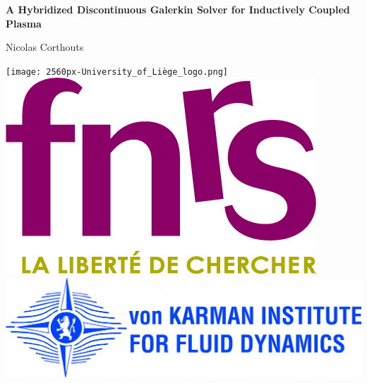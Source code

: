 \documentclass[24pt,t,table, aspectratio=169]{beamer}
\begin{document}
\begin{frame}
  
  \large
  \begin{center}
  \begin{mdframed}[linecolor=orange, backgroundcolor=orange!20]
  \Large
  \centering
  \textbf{A Hybridized Discontinuous Galerkin Solver for Inductively Coupled Plasma}
  
  \small
  
  Nicolas Corthouts
  \end{mdframed}
  \end{center}
  \begin{center}
  \end{center}
  
%
  \texttt{[image: 2560px-University\_of\_Liège\_logo.png]}\hfill\includegraphics[height=1 cm]{FRS-FNRS_ros_vert_transp.png}\hfill\includegraphics[height =1 cm]{vki_logo_blue_rectangular.jpg}
  \vfill
\end{frame}
\end{document}
